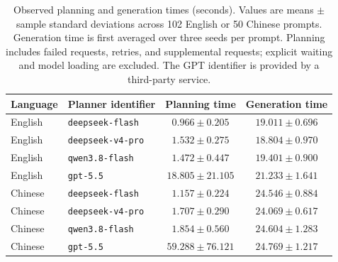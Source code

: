 \begin{table}[t]
\centering
\caption{Observed planning and generation times (seconds). Values are means $\pm$ sample standard deviations across 102 English or 50 Chinese prompts. Generation time is first averaged over three seeds per prompt. Planning includes failed requests, retries, and supplemental requests; explicit waiting and model loading are excluded. The GPT identifier is provided by a third-party service.}
\label{tab:planner_efficiency}
\begin{tabular}{llcc}
\hline
Language & Planner identifier & Planning time & Generation time \\
\hline
English & \texttt{deepseek-flash} & $0.966 \pm 0.205$ & $19.011 \pm 0.696$ \\
English & \texttt{deepseek-v4-pro} & $1.532 \pm 0.275$ & $18.804 \pm 0.970$ \\
English & \texttt{qwen3.8-flash} & $1.472 \pm 0.447$ & $19.401 \pm 0.900$ \\
English & \texttt{gpt-5.5} & $18.805 \pm 21.105$ & $21.233 \pm 1.641$ \\
Chinese & \texttt{deepseek-flash} & $1.157 \pm 0.224$ & $24.546 \pm 0.884$ \\
Chinese & \texttt{deepseek-v4-pro} & $1.707 \pm 0.290$ & $24.069 \pm 0.617$ \\
Chinese & \texttt{qwen3.8-flash} & $1.854 \pm 0.560$ & $24.604 \pm 1.283$ \\
Chinese & \texttt{gpt-5.5} & $59.288 \pm 76.121$ & $24.769 \pm 1.217$ \\
\hline
\end{tabular}
\end{table}
